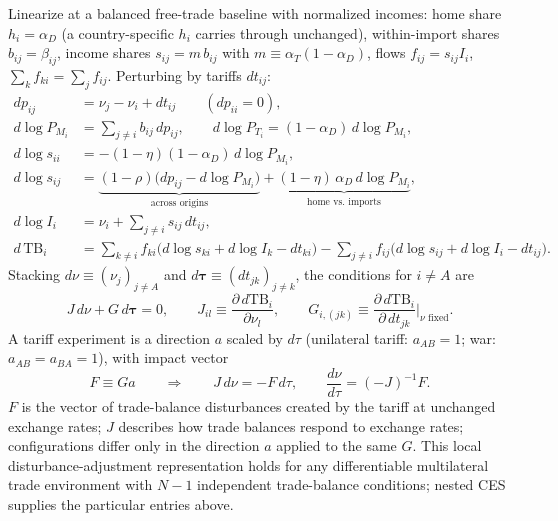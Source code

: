 \documentclass[11pt]{article}
\begin{document}
Linearize at a balanced free-trade baseline with normalized incomes: home share $h_i = \alpha_D$ (a country-specific $h_i$ carries through unchanged), within-import shares $b_{ij} = \beta_{ij}$, income shares $s_{ij} = m\, b_{ij}$ with $m \equiv \alpha_T(1-\alpha_D)$, flows $f_{ij} = s_{ij} I_i$, $\sum_k f_{ki} = \sum_j f_{ij}$. Perturbing by tariffs $dt_{ij}$:
\begin{align}
dp_{ij} &= \nu_j - \nu_i + dt_{ij} \qquad (dp_{ii} = 0),
\label{eq:dp}\\
d\log P_{M_i} &= \sum_{j\neq i} b_{ij}\, dp_{ij},
\qquad
d\log P_{T_i} = (1-\alpha_D)\, d\log P_{M_i} ,
\label{eq:dindex}\\
d\log s_{ii} &= -(1-\eta)(1-\alpha_D)\, d\log P_{M_i},
\label{eq:dshome}\\
d\log s_{ij} &= \underbrace{(1-\rho)\big( dp_{ij} - d\log P_{M_i} \big)}_{\text{across origins}}
+ \underbrace{(1-\eta)\,\alpha_D\, d\log P_{M_i}}_{\text{home vs.\ imports}} ,
\label{eq:dsfor}\\
d\log I_i &= \nu_i + \sum_{j\neq i} s_{ij}\, dt_{ij} ,
\label{eq:dincome}\\
d\,\mathrm{TB}_i
&= \sum_{k \neq i} f_{ki} \big( d\log s_{ki} + d\log I_k - dt_{ki} \big)
- \sum_{j \neq i} f_{ij} \big( d\log s_{ij} + d\log I_i - dt_{ij} \big) .
\label{eq:dtb}
\end{align}
Stacking $d\nu \equiv (\nu_j)_{j \neq A}$ and $d\boldsymbol{\tau} \equiv (dt_{jk})_{j \neq k}$, the conditions for $i \neq A$ are
\begin{equation}
J\, d\nu + G\, d\boldsymbol{\tau} = 0,
\qquad
J_{il} \equiv \frac{\partial\, d\mathrm{TB}_i}{\partial \nu_l},
\qquad
G_{i,(jk)} \equiv \frac{\partial\, d\mathrm{TB}_i}{\partial\, dt_{jk}}\bigg|_{\nu \text{ fixed}} .
\label{eq:JFdef}
\end{equation}
A tariff experiment is a direction $a$ scaled by $d\tau$ (unilateral tariff: $a_{AB} = 1$; war: $a_{AB} = a_{BA} = 1$), with impact vector
\begin{equation}
F \equiv G a
\qquad\Longrightarrow\qquad
J\, d\nu = -F\, d\tau,
\qquad
\frac{d\nu}{d\tau} = (-J)^{-1} F .
\label{eq:system}
\end{equation}
$F$ is the vector of trade-balance disturbances created by the tariff at unchanged exchange rates; $J$ describes how trade balances respond to exchange rates; configurations differ only in the direction $a$ applied to the same $G$. This local disturbance-adjustment representation holds for any differentiable multilateral trade environment with $N-1$ independent trade-balance conditions; nested CES supplies the particular entries above.
\end{document}
